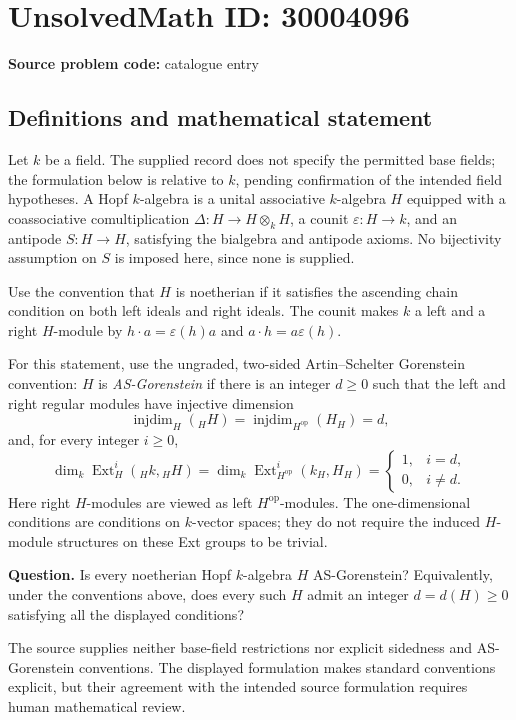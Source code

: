 \documentclass[11pt]{article}
\begin{document}
\section*{UnsolvedMath ID: 30004096}
\textbf{Source problem code:} catalogue entry
\subsection{Definitions and mathematical statement}
Let \(k\) be a field. The supplied record does not specify the permitted base fields; the formulation below is relative to \(k\), pending confirmation of the intended field hypotheses. A Hopf \(k\)-algebra is a unital associative \(k\)-algebra \(H\) equipped with a coassociative comultiplication \(\Delta:H\to H\otimes_k H\), a counit \(\varepsilon:H\to k\), and an antipode \(S:H\to H\), satisfying the bialgebra and antipode axioms. No bijectivity assumption on \(S\) is imposed here, since none is supplied.

Use the convention that \(H\) is noetherian if it satisfies the ascending chain condition on both left ideals and right ideals. The counit makes \(k\) a left and a right \(H\)-module by \(h\cdot a=\varepsilon(h)a\) and \(a\cdot h=a\varepsilon(h)\).

For this statement, use the ungraded, two-sided Artin--Schelter Gorenstein convention: \(H\) is \emph{AS-Gorenstein} if there is an integer \(d\geq 0\) such that the left and right regular modules have injective dimension
\[
\operatorname{injdim}_H({}_H H)=\operatorname{injdim}_{H^{\mathrm{op}}}(H_H)=d,
\]
and, for every integer \(i\geq 0\),
\[
\dim_k\operatorname{Ext}^{i}_H({}_H k,{}_H H)
=
\dim_k\operatorname{Ext}^{i}_{H^{\mathrm{op}}}(k_H,H_H)
=
\begin{cases}
1,&i=d,\\
0,&i\neq d.
\end{cases}
\]
Here right \(H\)-modules are viewed as left \(H^{\mathrm{op}}\)-modules. The one-dimensional conditions are conditions on \(k\)-vector spaces; they do not require the induced \(H\)-module structures on these Ext groups to be trivial.

\textbf{Question.} Is every noetherian Hopf \(k\)-algebra \(H\) AS-Gorenstein? Equivalently, under the conventions above, does every such \(H\) admit an integer \(d=d(H)\geq 0\) satisfying all the displayed conditions?

The source supplies neither base-field restrictions nor explicit sidedness and AS-Gorenstein conventions. The displayed formulation makes standard conventions explicit, but their agreement with the intended source formulation requires human mathematical review.
\end{document}
